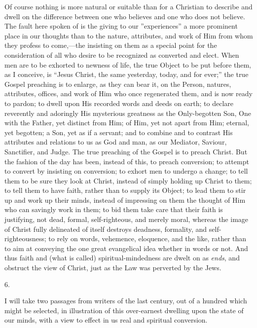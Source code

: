Of course nothing is more natural or suitable than for a Christian
to describe and dwell on the difference between one who believes and
one who does not believe. The fault here spoken of is the giving to
our ''experiences'' a more prominent place in our thoughts than to
the nature, attributes, and work of Him from whom they profess to
come,—the insisting on them as a special point for the consideration
of all who desire to be recognized as converted and elect. When men
are to be exhorted to newness of life, the true Object to be put
before them, as I conceive, is ``Jesus Christ, the same yesterday,
today, and for ever;'' the true Gospel preaching is to enlarge, as
they can bear it, on the Person, natures, attributes, offices, and
work of Him who once regenerated them, and is now ready to pardon; to
dwell upon His recorded words and deeds on earth; to declare
reverently and adoringly His mysterious greatness as the Only-begotten
Son, One with the Father, yet distinct from Him; of Him, yet not apart
from Him; eternal, yet begotten; a Son, yet as if a servant; and to
combine and to contrast His attributes and relations to us as God and
man, as our Mediator, Saviour, Sanctifier, and Judge. The true
preaching of the Gospel is to preach Christ. But the fashion of the
day has been, instead of this, to preach conversion; to attempt
to convert by insisting on conversion; to exhort men to undergo a
change; to tell them to be sure they look at Christ, instead of simply
holding up Christ to them; to tell them to have faith, rather than to
supply its Object; to lead them to stir up and work up their minds,
instead of impressing on them the thought of Him who can savingly work
in them; to bid them take care that their faith is justifying, not
dead, formal, self-righteous, and merely moral, whereas the image of
Christ fully delineated of itself destroys deadness, formality, and
self-righteousness; to rely on words, vehemence, eloquence, and the
like, rather than to aim at conveying the one great evangelical idea
whether in words or not. And thus faith and (what is called)
spiritual-mindedness are dwelt on as \emph{ends}, and obstruct the
view of Christ, just as the Law was perverted by the Jews.

6.

I will take two passages from writers of the last century, out of a
hundred which might be selected, in illustration of this over-earnest
dwelling upon the state of our minds, with a view to effect in us real
and spiritual conversion.

